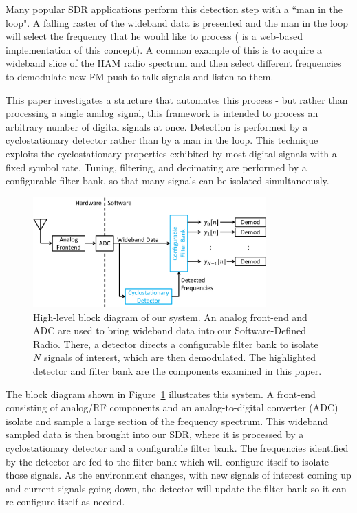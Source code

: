 \documentclass[12pt]{article}
\begin{document}
Many popular SDR applications perform this detection step with a ``man in the
loop".  A falling raster of the wideband data is presented and the man in the
loop will select the frequency that he would like to process (\cite{WebSDR}
is a web-based implementation of this concept).  A common example of this is to
acquire a wideband slice of the HAM radio spectrum and then select different
frequencies to demodulate new FM push-to-talk signals and listen to them.

This paper investigates a structure that automates this process - but rather
than processing a single analog signal, this framework is intended to process
an arbitrary number of digital signals at once. Detection is performed by
a cyclostationary detector rather than by a man in the loop. This technique
exploits the cyclostationary properties exhibited by most digital signals with
a fixed symbol rate.  Tuning, filtering, and decimating are performed by
a configurable filter bank, so that many signals can be isolated
simultaneously.  

\begin{figure}[h!]
    \begin{center}
    \includegraphics[width=0.8\textwidth]{block_diagram}%
    \end{center}
    \caption{High-level block diagram of our system. An analog front-end and
        ADC are used to bring wideband data into our Software-Defined Radio.
        There, a detector directs a configurable filter bank to isolate $N$
        signals of interest, which are then demodulated. The highlighted
        detector and filter bank are the components examined in this paper.}
    \label{fig:block_diagram}
\end{figure}

The block diagram shown in Figure~\ref{fig:block_diagram} illustrates this
system. A front-end consisting of analog/RF components and an analog-to-digital
converter (ADC) isolate and sample a large section of the frequency spectrum.
This wideband sampled data is then brought into our SDR, where it is processed
by a cyclostationary detector and a configurable filter bank. The frequencies identified by
the detector are fed to the filter bank which will configure itself to isolate
those signals. As the environment changes, with new signals of interest coming
up and current signals going down, the detector will update the filter bank so
it can re-configure itself as needed.
\end{document}
